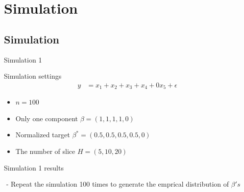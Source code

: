 \documentclass[ignorenonframetext,]{beamer}
\begin{document}
\section{Simulation}\label{simulation}

\subsection{Simulation}\label{simulation-1}

\begin{frame}{Simulation 1}

\begin{exampleblock}{Simulation settings}
\begin{align*}
y &= x_1 + x_2 + x_3 + x_4 + 0x_5 + \epsilon 
\end{align*}
\begin{itemize}
    \item $n = 100$
    \item Only one component $\beta = (1,1,1,1,0)$
    \item Normalized target $\beta^* = (0.5, 0.5, 0.5, 0.5, 0)$
    \item The number of slice $H = (5, 10, 20)$
\end{itemize}
\end{exampleblock}

\end{frame}

\begin{frame}{Simulation 1 results}

\includegraphics[height=0.1]{./pic/result_1} - Repeat the simulation 100
times to generate the emprical distribution of \(\beta's\)

\end{frame}
\end{document}
